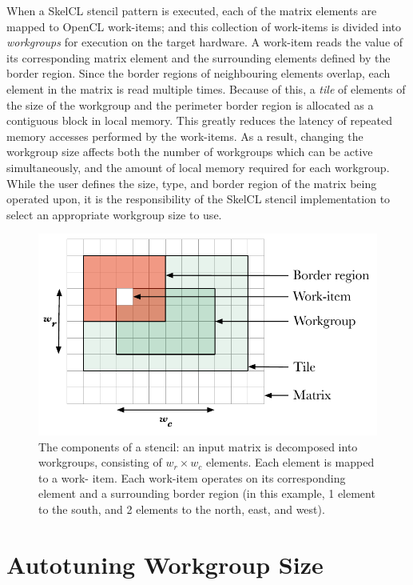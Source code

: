 \documentclass[preprint,nonatbib,10pt,nocopyrightspace]{sigplanconf}
\begin{document}
When a SkelCL stencil pattern is executed, each of the matrix elements are
mapped to OpenCL work-items; and this collection of work-items is divided into
\emph{workgroups} for execution on the target hardware. A work-item reads the
value of its corresponding matrix element and the surrounding elements defined
by the border region. Since the border regions of neighbouring elements overlap,
each element in the matrix is read multiple times. Because of this, a
\emph{tile} of elements of the size of the workgroup and the perimeter border
region is allocated as a contiguous block in local memory. This greatly reduces
the latency of repeated memory accesses performed by the work-items. As a
result, changing the workgroup size affects both the number of workgroups which
can be active simultaneously, and the amount of local memory required for each
workgroup. While the user defines the size, type, and border region of the
matrix being operated upon, it is the responsibility of the SkelCL stencil
implementation to select an appropriate workgroup size to use.

\begin{figure}
\centering
\includegraphics[width=.75\columnwidth]{img/stencil}
\caption[Stencil border region]{%
  The components of a stencil: an input matrix is decomposed into workgroups,
  consisting of $w_r \times w_c$ elements. Each element is mapped to a work-
  item. Each work-item operates on its corresponding element and a surrounding
  border region (in this example, 1 element to the south, and 2 elements to the
  north, east, and west).
  \vspace{-1em}
}
\label{fig:stencil-shape}
\end{figure}


\section{Autotuning Workgroup Size}
\end{document}
